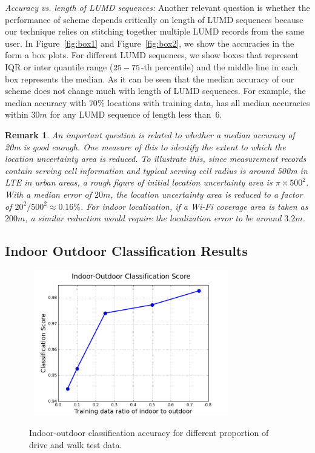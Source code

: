 \documentclass[conference, 10pt]{IEEEtran}
\newtheorem{remark}{Remark}
\begin{document}
{\em Accuracy vs. length of LUMD sequences:} Another relevant question is whether the
performance of scheme depends critically on length of LUMD sequences because our
technique relies on stitching together multiple LUMD records from the same user. In
Figure~\ref{fig:box1} and Figure~\ref{fig:box2}, we show the accuracies in the form a
box plots. For different LUMD sequences, we show boxes that represent IQR or inter 
quantile range ($25\--75$-th percentile) and the middle line in each box represents the median.
As it can be seen that the median accuracy of our scheme does not change much with
length of LUMD sequences. For example, the median accuracy with $70\%$ locations with
training data, has all median accuracies within $30m$ for any LUMD sequence of length
less than~6.

\begin{remark} An important question is related to whether a median accuracy of 20m
is good enough. One measure of this to identify the extent to which the location
uncertainty area is reduced. To illustrate this, since measurement records contain
serving cell information and typical serving cell radius is around 500m in LTE in
urban areas, a rough figure of initial location uncertainty area is $\pi\times
500^2$. With a median error of $20m$, the location uncertainty area is reduced to a factor 
of $20^2/500^2 \approx 0.16\%$. For indoor localization, if a Wi-Fi coverage area is taken as 
$200m$, a similar reduction would require the localization error to be around $3.2m$.
\end{remark}


\subsection{Indoor Outdoor Classification Results}


\begin{figure}[t]
\begin{center}
	\includegraphics[height=2.5in, width=3.5in]{./class_score.png}
\label{fig:class}
\caption{Indoor-outdoor classification accuracy for different proportion of drive and
walk test data.}
\end{center}
\end{figure}
\end{document}
